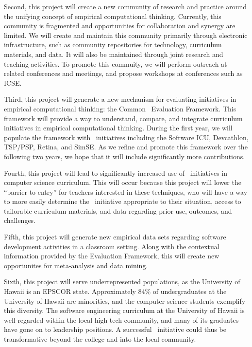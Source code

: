 Second, this project will create a new community of research and practice
around the unifying concept of empirical computational thinking.
Currently, this community is fragmented and opportunities for collaboration
and synergy are limited.  We will create and maintain this community
primarily through electronic infrastructure, such as community repositories
for technology, curriculum materials, and data.  It will also be maintained
through joint research and teaching activities.  To promote this commuity,
we will perform outreach at related conferences and meetings, and propose
workshops at conferences such as ICSE.

Third, this project will generate a new mechanism for evaluating initiatives
in empirical computational thinking: the Common \eCT\ Evaluation
Framework.  This framework will provide a way to understand, compare, and
integrate curriculum initiatives in empirical computational thinking.
During the first year, we will populate the framework with \eCT\
initiatives including the Software ICU, Devcathlon, TSP/PSP, Retina, and
SimSE.  As we refine and promote this framework over the following two
years, we hope that it will include significantly more contributions.

Fourth, this project will lead to significantly increased use of \eCT\
initiatives in computer science curriculum.  This will occur because this
project will lower the ``barrier to entry'' for teachers interested in
these techniques, who will have a way to more easily determine the \eCT\
initiative appropriate to their situation, access to tailorable curriculum
materials, and data regarding prior use, outcomes, and challenges.

Fifth, this project will generate new empirical data sets regarding
software development activities in a classroom setting.  Along with the
contextual information provided by the Evaluation Framework, this will
create new opportunites for meta-analysis and data mining.  

Sixth, this project will serve underrepresented populations, as the
University of Hawaii is an EPSCOR state. Approximately 84\% of
undergraduates at the University of Hawaii are minorities, and the computer
science students exemplify this diversity.  The software engineering
curriculum at the University of Hawaii is well-regarded within the local
high tech community, and many of its graduates have gone on to leadership
positions. A successful \eCT\ initiative could thus be transformative
beyond the college and into the local community.

